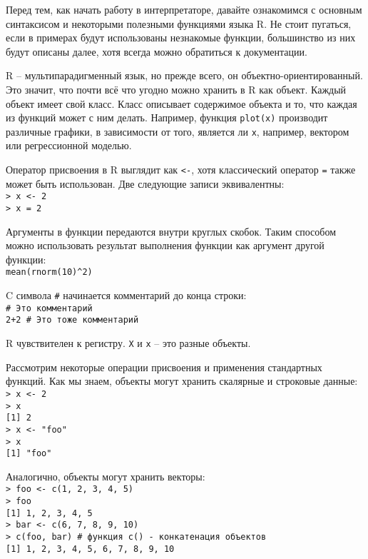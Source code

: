     Перед тем, как начать работу в интерпретаторе, давайте ознакомимся с основным 
    синтаксисом и некоторыми полезными функциями языка R. Не стоит пугаться, если в 
    примерах будут использованы незнакомые функции, большинство из них будут описаны
    далее, хотя всегда можно обратиться к документации.

    R -- мультипарадигменный язык, но прежде всего, он объектно-ориентированный. Это 
    значит, что почти всё что угодно можно хранить в R как объект. Каждый объект имеет 
    свой класс. Класс описывает содержимое объекта и то, что каждая из функций может с 
    ним делать. Например, функция \texttt{plot(x)} производит различные графики, в 
    зависимости от того, является ли \texttt{x}, например, вектором или регрессионной моделью. 
    
    Оператор присвоения в R выглядит как \texttt{<-}, хотя классический оператор 
    \texttt{=} также может быть использован. Две следующие записи эквивалентны: \\
    \indent \texttt{> x <- 2} \\
    \indent \texttt{> x = 2} 
    
    Аргументы в функции передаются внутри круглых скобок. Таким способом можно 
    использовать результат выполнения функции как аргумент другой функции: \\
    \indent \texttt{mean(rnorm(10)\^{}2)} 
    
    C символа \texttt{\#} начинается комментарий до конца строки: \\
    \indent \texttt{\# Это комментарий} \\
    \indent \texttt{2+2 \# Это тоже комментарий} 
    
    R чувствителен к регистру. \texttt{X} и \texttt{x} -- это разные объекты. 
    
    Рассмотрим некоторые операции присвоения и применения стандартных функций. Как мы
    знаем, объекты могут хранить скалярные и строковые данные: \\
    \indent \texttt{> x <- 2} \\
    \indent \texttt{> x} \\
    \indent \texttt{[1] 2} \\
    \indent \texttt{> x <- "foo"} \\
    \indent \texttt{> x } \\
    \indent \texttt{[1] "foo"} 
    
    Аналогично, объекты могут хранить векторы: \\
    \indent \texttt{> foo <- c(1, 2, 3, 4, 5)} \\
    \indent \texttt{> foo} \\
    \indent \texttt{[1] 1, 2, 3, 4, 5} \\
    \indent \texttt{> bar <- c(6, 7, 8, 9, 10)} \\
    \indent \texttt{> c(foo, bar) \# функция c() - конкатенация объектов} \\
    \indent \texttt{[1] 1, 2, 3, 4, 5, 6, 7, 8, 9, 10} 

